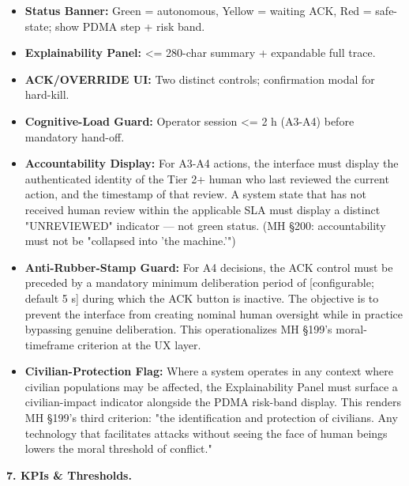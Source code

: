 \documentclass[11pt]{article}
\begin{document}
\begin{itemize}\setlength\itemsep{0pt}
\item \textbf{Status Banner:} Green = autonomous, Yellow = waiting ACK, Red = safe-state; show PDMA step + risk band.
\item \textbf{Explainability Panel:} <= 280-char summary + expandable full trace.
\item \textbf{ACK/OVERRIDE UI:} Two distinct controls; confirmation modal for hard-kill.
\item \textbf{Cognitive-Load Guard:} Operator session <= 2 h (A3-A4) before mandatory hand-off.
\item \textbf{Accountability Display:} For A3-A4 actions, the interface must display the authenticated identity of the Tier 2+ human who last reviewed the current action, and the timestamp of that review. A system state that has not received human review within the applicable SLA must display a distinct "UNREVIEWED" indicator — not green status. (MH §200: accountability must not be "collapsed into 'the machine.'")
\item \textbf{Anti-Rubber-Stamp Guard:} For A4 decisions, the ACK control must be preceded by a mandatory minimum deliberation period of [configurable; default 5 s] during which the ACK button is inactive. The objective is to prevent the interface from creating nominal human oversight while in practice bypassing genuine deliberation. This operationalizes MH §199's moral-timeframe criterion at the UX layer.
\item \textbf{Civilian-Protection Flag:} Where a system operates in any context where civilian populations may be affected, the Explainability Panel must surface a civilian-impact indicator alongside the PDMA risk-band display. This renders MH §199's third criterion: "the identification and protection of civilians. Any technology that facilitates attacks without seeing the face of human beings lowers the moral threshold of conflict."
\end{itemize}


\textbf{7. KPIs \& Thresholds.}
\end{document}
